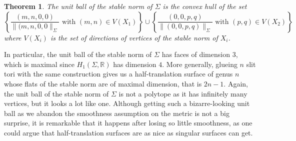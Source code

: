 \documentclass{article}
\newcommand{\RR}{\mathbb{R}}
\newcommand{\StS}[1]{\|#1\|_\Sigma}
\newtheorem{thm}{Theorem}[section]
\theoremstyle{definition}
\begin{document}
\begin{thm}\label{convex hull}
    The unit ball of the stable norm of $\Sigma$ is the convex hull of the set $$ \left \{ \frac{(m,n,0,0)}{\StS{(m,n,0,0}} \text{ with } (m,n)\in V(X_1)  \right \} \cup \left\{\frac{(0,0,p,q)}{\StS{(0,0,p,q)}} \text{ with } (p,q)\in V(X_2)\right \} $$ where $V(X_i)$ is the set of directions of vertices of the stable norm of $X_i$.
\end{thm}


In particular, the unit ball of the stable norm of $\Sigma$ has faces of dimension $3$, which is maximal since $H_1(\Sigma,\RR)$ has dimension $4$. More generally, glueing $n$ slit tori with the same construction gives us a half-translation surface of genus $n$ whose flats of the stable norm are of maximal dimension, that is $2n-1$. Again, the unit ball of the stable norm of $\Sigma$ is not a polytope as it has infinitely many vertices, but it looks a lot like one. Although getting such a bizarre-looking unit ball as we abandon the smoothness assumption on the metric is not a big surprise, it is remarkable that it happens after losing so little smoothness, as one could argue that half-translation surfaces are as nice as singular surfaces can get.
\newline 
\end{document}
